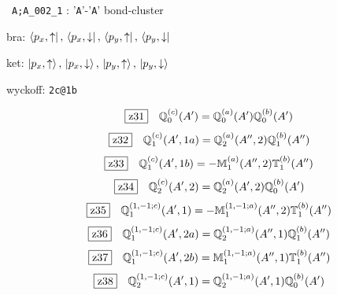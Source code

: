 \documentclass[fleqn,10pt,landscape]{jsarticle}
\begin{document}
\noindent\textbullet\, \texttt{A;A_002_1} : '\texttt{A}'-'\texttt{A}' bond-cluster

\noindent\quad * bra: $\bra{p_{x},\uparrow},\, \bra{p_{x},\downarrow},\, \bra{p_{y},\uparrow},\, \bra{p_{y},\downarrow}$

\noindent\quad * ket: $\ket{p_{x},\uparrow},\, \ket{p_{x},\downarrow},\, \ket{p_{y},\uparrow},\, \ket{p_{y},\downarrow}$

\noindent\quad * wyckoff: \texttt{2c@1b}

\begin{dmath*}
\hspace*{3mm}\fbox{z31}\quad \mathbb{Q}_{0}^{(c)}(A^{\prime})=\mathbb{Q}_{0}^{(a)}(A^{\prime}) \mathbb{Q}_{0}^{(b)}(A^{\prime})
\end{dmath*}
\begin{dmath*}
\hspace*{3mm}\fbox{z32}\quad \mathbb{Q}_{1}^{(c)}(A^{\prime},1a)=\mathbb{Q}_{2}^{(a)}(A^{\prime\prime},2) \mathbb{Q}_{1}^{(b)}(A^{\prime\prime})
\end{dmath*}
\begin{dmath*}
\hspace*{3mm}\fbox{z33}\quad \mathbb{Q}_{1}^{(c)}(A^{\prime},1b)=- \mathbb{M}_{1}^{(a)}(A^{\prime\prime},2) \mathbb{T}_{1}^{(b)}(A^{\prime\prime})
\end{dmath*}
\begin{dmath*}
\hspace*{3mm}\fbox{z34}\quad \mathbb{Q}_{2}^{(c)}(A^{\prime},2)=\mathbb{Q}_{2}^{(a)}(A^{\prime},2) \mathbb{Q}_{0}^{(b)}(A^{\prime})
\end{dmath*}
\begin{dmath*}
\hspace*{3mm}\fbox{z35}\quad \mathbb{Q}_{1}^{(1,-1;c)}(A^{\prime},1)=- \mathbb{M}_{1}^{(1,-1;a)}(A^{\prime\prime},2) \mathbb{T}_{1}^{(b)}(A^{\prime\prime})
\end{dmath*}
\begin{dmath*}
\hspace*{3mm}\fbox{z36}\quad \mathbb{Q}_{1}^{(1,-1;c)}(A^{\prime},2a)=\mathbb{Q}_{2}^{(1,-1;a)}(A^{\prime\prime},1) \mathbb{Q}_{1}^{(b)}(A^{\prime\prime})
\end{dmath*}
\begin{dmath*}
\hspace*{3mm}\fbox{z37}\quad \mathbb{Q}_{1}^{(1,-1;c)}(A^{\prime},2b)=\mathbb{M}_{1}^{(1,-1;a)}(A^{\prime\prime},1) \mathbb{T}_{1}^{(b)}(A^{\prime\prime})
\end{dmath*}
\begin{dmath*}
\hspace*{3mm}\fbox{z38}\quad \mathbb{Q}_{2}^{(1,-1;c)}(A^{\prime},1)=\mathbb{Q}_{2}^{(1,-1;a)}(A^{\prime},1) \mathbb{Q}_{0}^{(b)}(A^{\prime})
\end{dmath*}
\end{document}

